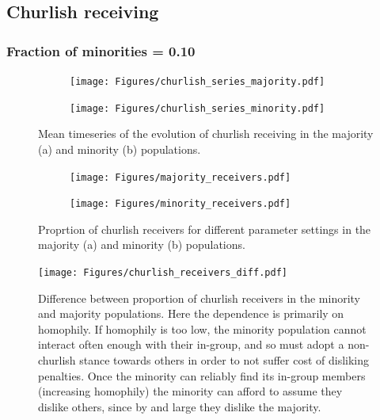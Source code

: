 \documentclass[11pt,letterpaper]{article}
\begin{document}
\subsection{Churlish receiving}

\subsubsection{Fraction of minorities = 0.10}

\begin{figure}[H]
  \centering
  \begin{subfigure}{0.49\textwidth}
    \centering
    \texttt{[image: Figures/churlish\_series\_majority.pdf]}
    \caption{}
    \label{fig:}
  \end{subfigure}
  \begin{subfigure}{0.49\textwidth}
    \centering
    \texttt{[image: Figures/churlish\_series\_minority.pdf]}
    \caption{}
    \label{fig:}
  \end{subfigure}
  \caption{Mean timeseries of the evolution of churlish receiving in the
    majority (a) and minority (b) populations.}
  \label{fig:regressions}
\end{figure}


\begin{figure}[H]
  \centering
  \begin{subfigure}{0.49\textwidth}
    \centering
    \texttt{[image: Figures/majority\_receivers.pdf]}
    \caption{}
    \label{fig:}
  \end{subfigure}
  \begin{subfigure}{0.49\textwidth}
    \centering
    \texttt{[image: Figures/minority\_receivers.pdf]}
    \caption{}
    \label{fig:}
  \end{subfigure}
  \caption{Proprtion of churlish receivers for different parameter settings in the
    majority (a) and minority (b) populations.}
  \label{fig:regressions}
\end{figure}

\begin{figure}[H]
  \centering
    \texttt{[image: Figures/churlish\_receivers\_diff.pdf]}
  \caption{Difference between proportion of churlish receivers in the minority 
    and majority populations. Here the dependence is primarily on homophily.
    If homophily is too low, the minority population cannot interact often
    enough with their in-group, and so must adopt a non-churlish stance towards
    others in order to not suffer cost of disliking penalties. Once the minority
    can reliably find its in-group members (increasing homophily) the minority
    can afford to assume they dislike others, since by and large they dislike
    the majority.
  }
  \label{fig:}
\end{figure}
\end{document}
